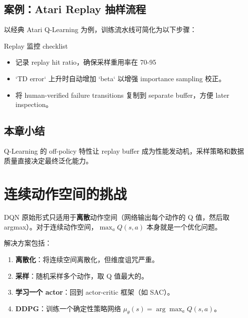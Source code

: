 \documentclass[a4paper]{article}
\begin{document}
\subsection{案例：Atari Replay 抽样流程}

以经典 Atari Q-Learning 为例，训练流水线可简化为以下步骤：


\begin{importantbox}{Replay 监控 checklist}
\begin{itemize}
    \item 记录 replay hit ratio，确保采样重用率在 70-95%
    \item `TD error` 上升时自动增加 `beta` 以增强 importance sampling 校正。
    \item 将 human-verified failure transitions 复制到 separate buffer，方便 later inspection。
\end{itemize}
\end{importantbox}

\subsection{本章小结}

Q-Learning 的 off-policy 特性让 replay buffer 成为性能发动机，采样策略和数据质量直接决定最终泛化能力。

\section{连续动作空间的挑战}

DQN 原始形式只适用于\textbf{离散}动作空间（网络输出每个动作的 Q 值，然后取 argmax）。对于连续动作空间，$\max_a Q(s,a)$ 本身就是一个优化问题。

解决方案包括：
\begin{enumerate}
    \item \textbf{离散化}：将连续空间离散化，但维度诅咒严重。
    \item \textbf{采样}：随机采样多个动作，取 Q 值最大的。
    \item \textbf{学习一个 actor}：回到 actor-critic 框架（如 SAC）。
    \item \textbf{DDPG}：训练一个确定性策略网络 $\mu_\theta(s) = \arg\max_a Q(s,a)$。
\end{enumerate}
\end{document}
